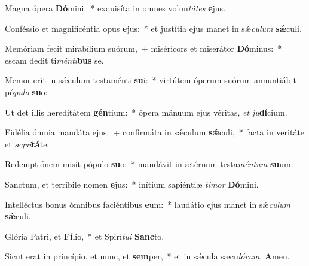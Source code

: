 \item Magna ópera \textbf{Dó}mini:~* exquisíta in omnes volun\textit{tá}\textit{tes} \textbf{e}jus.

\item Conféssio et magnificéntia opus \textbf{e}jus:~* et justítia ejus manet in sǽ\textit{cu}\textit{lum} \textbf{sǽ}culi.

\item Memóriam fecit mirabílium suórum,~+ miséricors et miserátor \textbf{Dó}minus:~* escam dedit ti\textit{mén}\textit{ti}\textbf{bus} se.

\item Memor erit in sǽculum testaménti \textbf{su}i:~* virtútem óperum suórum annuntiábit pó\textit{pu}\textit{lo} \textbf{su}o:

\item Ut det illis hereditátem \textbf{gén}tium:~* ópera mánuum ejus véritas, \textit{et} \textit{ju}\textbf{dí}cium.

\item Fidélia ómnia mandáta ejus:~+ confirmáta in sǽculum \textbf{sǽ}culi,~* facta in veritáte et \textit{æ}\textit{qui}\textbf{tá}te.

\item Redemptiónem misit pópulo \textbf{su}o:~* mandávit in ætérnum testa\textit{mén}\textit{tum} \textbf{su}um.

\item Sanctum, et terríbile nomen \textbf{e}jus:~* inítium sapiéntiæ \textit{ti}\textit{mor} \textbf{Dó}mini.

\item Intelléctus bonus ómnibus faciéntibus \textbf{e}um:~* laudátio ejus manet in sǽ\textit{cu}\textit{lum} \textbf{sǽ}culi.

\item Glória Patri, et \textbf{Fí}lio,~* et Spirí\textit{tu}\textit{i} \textbf{Sanc}to.

\item Sicut erat in princípio, et nunc, et \textbf{sem}per,~* et in sǽcula sæcu\textit{ló}\textit{rum}. \textbf{A}men.
